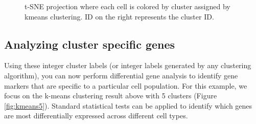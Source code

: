 \documentclass[10pt,oneside]{article}\usepackage[]{graphicx}\usepackage[]{color}
\newenvironment{knitrout}{}{} %
\begin{document}
\begin{figure}[htbp]
\begin{center}
\begin{knitrout}
{}



\end{knitrout}
\caption{t-SNE projection where each cell is colored by cluster assigned by kmeans clustering. ID on the right represents the cluster ID.}
\label{fig:kmeans}
\end{center}
\end{figure}

\subsection{Analyzing cluster specific genes}
Using these integer cluster labels (or integer labels generated by any clustering algorithm), you can now perform differential gene analysis to identify gene markers that are specific to a particular cell population. For this example, we focus on the k-means clustering result above with 5 clusters (Figure \ref{fig:kmeans5}). Standard statistical tests can be applied to identify which genes are most differentially expressed across different cell types.
\newpage
\vspace{0.5in}
\end{document}
